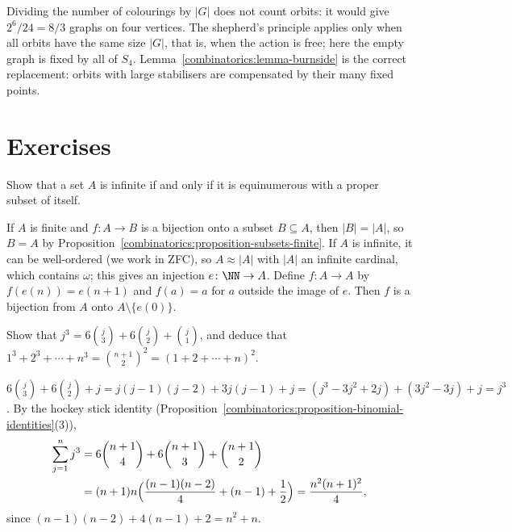 \begin{counterexample}\label{combinatorics:counterexample-orbits-average}
Dividing the number of colourings by $|G|$ does not count orbits: it would give $2^6/24 = 8/3$ graphs on four vertices. The shepherd's principle applies only when all orbits have the same size $|G|$,
that is, when the action is free; here the empty graph is fixed by all of $S_4$. Lemma~\ref{combinatorics:lemma-burnside} is the correct replacement: orbits with large stabilisers are compensated by
their many fixed points.
\end{counterexample}

\section{Exercises}\label{combinatorics:section-exercises}

\begin{exercise}\label{combinatorics:exercise-dedekind-infinite}
Show that a set $A$ is infinite if and only if it is equinumerous with a proper subset of itself.
\end{exercise}

\begin{solution}
If $A$ is finite and $f \colon A \to B$ is a bijection onto a subset $B \subseteq A$, then $|B| = |A|$, so $B = A$ by Proposition~\ref{combinatorics:proposition-subsets-finite}. If $A$ is infinite, it
can be well-ordered (we work in ZFC), so $A \approx |A|$ with $|A|$ an infinite cardinal, which contains $\omega$; this gives an injection $e \colon \NN \to A$. Define $f \colon A \to A$ by
$f(e(n)) = e(n + 1)$ and $f(a) = a$ for $a$ outside the image of $e$. Then $f$ is a bijection from $A$ onto $A \setminus \{e(0)\}$.
\end{solution}

\begin{exercise}\label{combinatorics:exercise-sum-of-cubes}
Show that $j^3 = 6\binom{j}{3} + 6\binom{j}{2} + \binom{j}{1}$, and deduce that $1^3 + 2^3 + \cdots + n^3 = \binom{n + 1}{2}^2 = (1 + 2 + \cdots + n)^2$.
\end{exercise}

\begin{solution}
$6\binom{j}{3} + 6\binom{j}{2} + j = j(j - 1)(j - 2) + 3j(j - 1) + j = (j^3 - 3j^2 + 2j) + (3j^2 - 3j) + j = j^3$. By the hockey stick identity
(Proposition~\ref{combinatorics:proposition-binomial-identities}(3)),
\[
\begin{aligned}
\sum_{j=1}^{n}j^3 &= 6\binom{n + 1}{4} + 6\binom{n + 1}{3} + \binom{n + 1}{2}\\
&= (n + 1)n\Bigl(\frac{(n - 1)(n - 2)}{4} + (n - 1) + \frac12\Bigr) = \frac{n^2(n + 1)^2}{4},
\end{aligned}
\]
since $(n - 1)(n - 2) + 4(n - 1) + 2 = n^2 + n$.
\end{solution}

